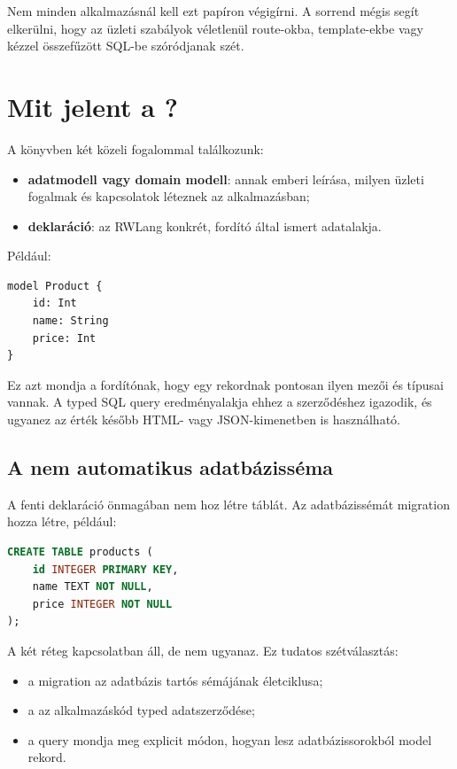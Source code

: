Nem minden alkalmazásnál kell ezt papíron végigírni. A sorrend mégis segít elkerülni, hogy az üzleti szabályok véletlenül route-okba, template-ekbe vagy kézzel összefűzött SQL-be szóródjanak szét.

\section{Mit jelent a ?}

A könyvben két közeli fogalommal találkozunk:

\begin{itemize}
  \item \textbf{adatmodell vagy domain modell}: annak emberi leírása, milyen üzleti fogalmak és kapcsolatok léteznek az alkalmazásban;
  \item \textbf{ deklaráció}: az RWLang konkrét, fordító által ismert adatalakja.
\end{itemize}

Például:

\begin{lstlisting}[language=RWLang]
model Product {
    id: Int
    name: String
    price: Int
}
\end{lstlisting}

Ez azt mondja a fordítónak, hogy egy  rekordnak pontosan ilyen mezői és típusai vannak. A typed SQL query eredményalakja ehhez a szerződéshez igazodik, és ugyanez az érték később HTML- vagy JSON-kimenetben is használható.

\subsection*{A  nem automatikus adatbázisséma}

A fenti deklaráció önmagában nem hoz létre  táblát. Az adatbázissémát migration hozza létre, például:

\begin{lstlisting}[language=SQL]
CREATE TABLE products (
    id INTEGER PRIMARY KEY,
    name TEXT NOT NULL,
    price INTEGER NOT NULL
);
\end{lstlisting}

A két réteg kapcsolatban áll, de nem ugyanaz. Ez tudatos szétválasztás:

\begin{itemize}
  \item a migration az adatbázis tartós sémájának életciklusa;
  \item a  az alkalmazáskód typed adatszerződése;
  \item a query mondja meg explicit módon, hogyan lesz adatbázissorokból model rekord.
\end{itemize}

